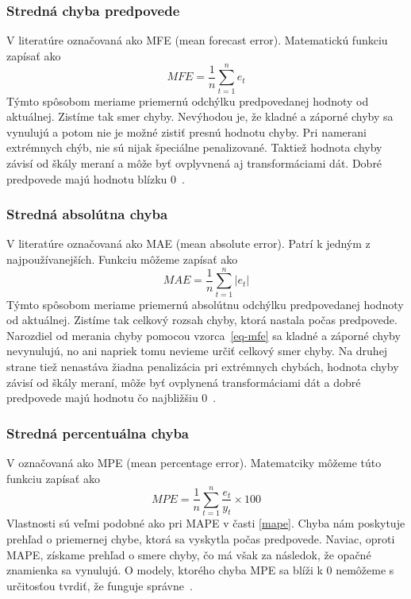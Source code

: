 \documentclass[a4paper,slovak,12pt,appendix]{article}
\begin{document}
\subsubsection{Stredná chyba predpovede}
V literatúre označovaná ako MFE (mean forecast error). Matematickú funkciu
zapísať ako
\begin{equation}
  MFE = \frac{1}{n} \sum_{t=1}^{n} e_t
  \label{eq-mfe}
\end{equation}
Týmto spôsobom meriame priemernú odchýlku predpovedanej hodnoty od aktuálnej.
Zistíme tak smer chyby. Nevýhodou je, že kladné a záporné chyby sa vynulujú
a potom nie je možné zistiť presnú hodnotu chyby. Pri namerani extrémnych chýb,
nie sú nijak špeciálne penalizované. Taktiež hodnota chyby závisí od škály
meraní a môže byť ovplyvnená aj transformáciami dát. Dobré predpovede majú
hodnotu blízku 0~\cite{Agrawal2013}.

\subsubsection{Stredná absolútna chyba}
V literatúre označovaná ako MAE (mean absolute error). Patrí k jedným
z najpoužívanejších. Funkciu môžeme zapísať ako
\begin{equation}
  MAE = \frac{1}{n} \sum_{t=1}^{n} |e_t|
  \label{eq-mae}
\end{equation}
Týmto spôsobom meriame priemernú absolútnu odchýlku predpovedanej hodnoty od
aktuálnej. Zistíme tak celkový rozsah chyby, ktorá nastala počas predpovede.
Narozdiel od merania chyby pomocou vzorca~\ref{eq-mfe} sa kladné a záporné
chyby nevynulujú, no ani napriek tomu nevieme určiť celkový smer chyby.
Na druhej strane tiež nenastáva žiadna penalizácia pri extrémnych chybách,
hodnota chyby závisí od škály meraní, môže byť ovplynená transformáciami dát
a dobré predpovede majú hodnotu čo
najbližšiu 0~\cite{Agrawal2013, Gutierrez2015}.

\subsubsection{Stredná percentuálna chyba}
V označovaná ako MPE (mean percentage error). Matematciky môžeme túto funkciu
zapísať ako
\begin{equation}
  MPE = \frac{1}{n} \sum_{t=1}^{n} \frac{e_t}{y_t} \times 100
  \label{eq-mpe}
\end{equation}
Vlastnosti sú veľmi podobné ako pri MAPE v časti \ref{mape}. Chyba nám
poskytuje prehľad o priemernej chybe, ktorá sa vyskytla počas predpovede.
Naviac, oproti MAPE, získame prehľad o smere chyby, čo má však za následok, že
opačné znamienka sa vynulujú. O modely, ktorého chyba MPE sa blíži k 0
nemôžeme s určitosťou tvrdiť, že funguje správne~\cite{Agrawal2013}.
\end{document}
